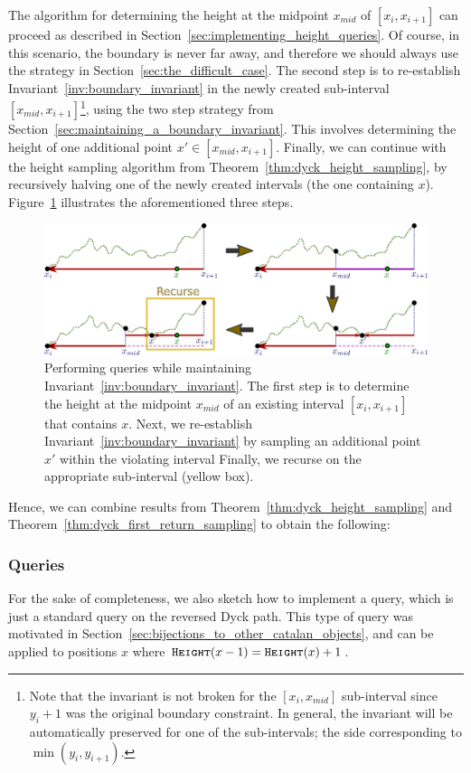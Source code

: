 The algorithm for determining the height at the midpoint $x_{mid}$ of $[x_i,x_{i+1}]$
can proceed as described in Section~\ref{sec:implementing_height_queries}.
Of course, in this scenario, the boundary is never far away, and therefore we should always use the strategy in Section~\ref{sec:the_difficult_case}.
The second step is to re-establish Invariant~\ref{inv:boundary_invariant} in the newly created sub-interval $[x_{mid},x_{i+1}]$\footnote{
Note that the invariant is not broken for the $[x_i,x_{mid}]$ sub-interval since $y_i+1$ was the original boundary constraint.
In general, the invariant will be automatically preserved for one of the sub-intervals; the side corresponding to $\min(y_i,y_{i+1})$.},
using the two step strategy from Section~\ref{sec:maintaining_a_boundary_invariant}.
This involves determining the height of one additional point $x'\in [x_{mid},x_{i+1}]$.
Finally, we can continue with the height sampling algorithm from Theorem~\ref{thm:dyck_height_sampling},
by recursively halving one of the newly created intervals (the one containing $x$).
Figure~\ref{fig:dyck_invariant_height_queries} illustrates the aforementioned three steps.
\begin{figure}[htpb]
    \centering
    \includegraphics[width=\textwidth]{images/dyck_invariant_height_queries.pdf}
    \caption{Performing  queries while maintaining Invariant~\ref{inv:boundary_invariant}.
    The first step is to determine the height at the midpoint $x_{mid}$ of an existing interval $[x_i,x_{i+1}]$ that contains $x$.
    Next, we re-establish Invariant~\ref{inv:boundary_invariant} by sampling an additional point $x'$ within the violating interval
    Finally, we recurse on the appropriate sub-interval (yellow box).
    }
    \label{fig:dyck_invariant_height_queries}
\end{figure}

Hence, we can combine results from Theorem~\ref{thm:dyck_height_sampling} and Theorem~\ref{thm:dyck_first_return_sampling} to obtain the following:
\CatalanGrand*


\subsubsection{ Queries}
\label{sec:reverse_first_return_queries}
For the sake of completeness, we also sketch how to implement a  query,
which is just a standard  query on the reversed Dyck path.
This type of query was motivated in Section~\ref{sec:bijections_to_other_catalan_objects},
and can be applied to positions $x$ where $\texttt{\textsc{Height}}(x-1) = \texttt{\textsc{Height}}(x)+1$.

